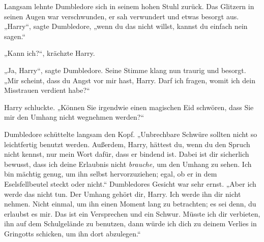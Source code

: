 Langsam lehnte Dumbledore sich in seinem hohen Stuhl zurück. Das Glitzern in seinen Augen war verschwunden, er sah verwundert und etwas besorgt aus. „Harry“, sagte Dumbledore, „wenn du das nicht willst, kannst du einfach nein sagen.“

„Kann ich?“, krächzte Harry.

„Ja, Harry“, sagte Dumbledore. Seine Stimme klang nun traurig und besorgt. „Mir scheint, dass du Angst vor mir hast, Harry. Darf ich fragen, womit ich dein Misstrauen verdient habe?“

Harry schluckte. „Können Sie irgendwie einen magischen Eid schwören, dass Sie mir den Umhang nicht wegnehmen werden?“

Dumbledore schüttelte langsam den Kopf. „Unbrechbare Schwüre sollten nicht so leichtfertig benutzt werden. Außerdem, Harry, hättest du, wenn du den Spruch nicht kennst, nur mein Wort dafür, dass er bindend ist. Dabei ist dir sicherlich bewusst, dass ich deine Erlaubnis nicht \emph{brauche,} um den Umhang zu sehen. Ich bin mächtig genug, um ihn selbst hervorzuziehen; egal, ob er in dem Eselsfellbeutel steckt oder nicht.“ Dumbledores Gesicht war sehr ernst. „Aber ich werde das nicht tun. Der Umhang gehört dir, Harry. Ich werde ihn dir nicht nehmen. Nicht einmal, um ihn einen Moment lang zu betrachten; es sei denn, du erlaubst es mir. Das ist ein Versprechen und ein Schwur. Müsste ich dir verbieten, ihn auf dem Schulgelände zu benutzen, dann würde ich dich zu deinem Verlies in Gringotts schicken, um ihn dort abzulegen.“

